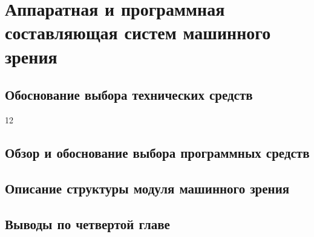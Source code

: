 \chapter{Аппаратная и программная составляющая систем машинного зрения} \label{chapt4}

\section{Обоснование выбора технических средств} \label{sect4_1}

12

\section{Обзор и обоснование выбора программных средств} \label{sect4_2}

\section{Описание структуры модуля машинного зрения} \label{sect4_3}

\section{Выводы по четвертой главе} \label{sect4_4}
